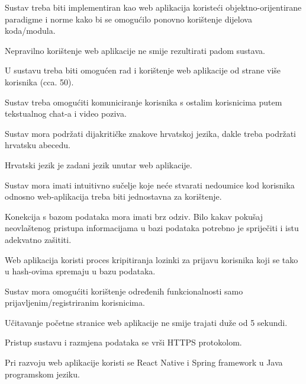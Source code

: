 				\begin{packed_item}
					
					\item Sustav treba biti implementiran kao web aplikacija koristeći objektno-orijentirane paradigme i norme kako bi se omogućilo ponovno korištenje dijelova koda/modula.
					\item Nepravilno korištenje web aplikacije ne smije rezultirati padom sustava.
					\item U sustavu treba biti omogućen rad i korištenje web aplikacije od strane više korisnika (cca. 50).
					\item Sustav treba omogućiti komuniciranje korisnika s ostalim korisnicima putem tekstualnog chat-a i video poziva.
					\item Sustav mora podržati dijakritičke znakove hrvatskoj jezika, dakle treba podržati hrvatsku abecedu.
					\item Hrvatski jezik je zadani jezik unutar web aplikacije.
					\item Sustav mora imati intuitivno sučelje koje neće stvarati nedoumice kod korisnika odnosno web-aplikacija treba biti jednostavna za korištenje.
					\item Konekcija s bazom podataka mora imati brz odziv. Bilo kakav pokušaj neovlaštenog pristupa informacijama u bazi podataka potrebno je spriječiti i istu adekvatno zašititi.
					\item Web aplikacija koristi proces kripitiranja lozinki za prijavu korisnika koji se tako u hash-ovima spremaju u bazu podataka.
					\item Sustav mora omogućiti korištenje određenih funkcionalnosti samo prijavljenim/registriranim korisnicima.
					\item Učitavanje početne stranice web aplikacije ne smije trajati duže od 5 sekundi.
					\item Pristup sustavu i razmjena podataka se vrši HTTPS protokolom.
					\item Pri razvoju web aplikacije koristi se React Native i Spring framework u Java programskom jeziku.
					
				\end{packed_item}
